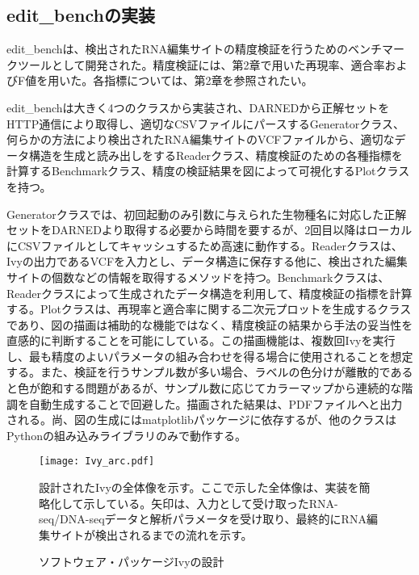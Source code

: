 \subsection{edit\_benchの実装}
edit\_benchは、検出されたRNA編集サイトの精度検証を行うためのベンチマークツールとして開発された。精度検証には、第2章で用いた再現率、適合率およびF値を用いた。各指標については、第2章を参照されたい。
\par
edit\_benchは大きく4つのクラスから実装され、DARNEDから正解セットをHTTP通信により取得し、適切なCSVファイルにパースするGeneratorクラス、何らかの方法により検出されたRNA編集サイトのVCFファイルから、適切なデータ構造を生成と読み出しをするReaderクラス、精度検証のための各種指標を計算するBenchmarkクラス、精度の検証結果を図によって可視化するPlotクラスを持つ。
\par
Generatorクラスでは、初回起動のみ引数に与えられた生物種名に対応した正解セットをDARNEDより取得する必要から時間を要するが、2回目以降はローカルにCSVファイルとしてキャッシュするため高速に動作する。Readerクラスは、Ivyの出力であるVCFを入力とし、データ構造に保存する他に、検出された編集サイトの個数などの情報を取得するメソッドを持つ。Benchmarkクラスは、Readerクラスによって生成されたデータ構造を利用して、精度検証の指標を計算する。Plotクラスは、再現率と適合率に関する二次元プロットを生成するクラスであり、図の描画は補助的な機能ではなく、精度検証の結果から手法の妥当性を直感的に判断することを可能にしている。この描画機能は、複数回Ivyを実行し、最も精度のよいパラメータの組み合わせを得る場合に使用されることを想定する。また、検証を行うサンプル数が多い場合、ラベルの色分けが離散的であると色が飽和する問題があるが、サンプル数に応じてカラーマップから連続的な階調を自動生成することで回避した。描画された結果は、PDFファイルへと出力される。尚、図の生成にはmatplotlibパッケージに依存するが、他のクラスはPythonの組み込みライブラリのみで動作する。
\begin{figure}[!h]
	\begin{center}
		\texttt{[image: Ivy\_arc.pdf]}
	\end{center}
	\vspace*{-1cm}
	\caption{ソフトウェア・パッケージIvyの設計}
	\label{fig:Ivy_arch}
	\begin{flushleft}
		\small{設計されたIvyの全体像を示す。ここで示した全体像は、実装を簡略化して示している。矢印は、入力として受け取ったRNA-seq/DNA-seqデータと解析パラメータを受け取り、最終的にRNA編集サイトが検出されるまでの流れを示す。}
	\end{flushleft}
\end{figure}

